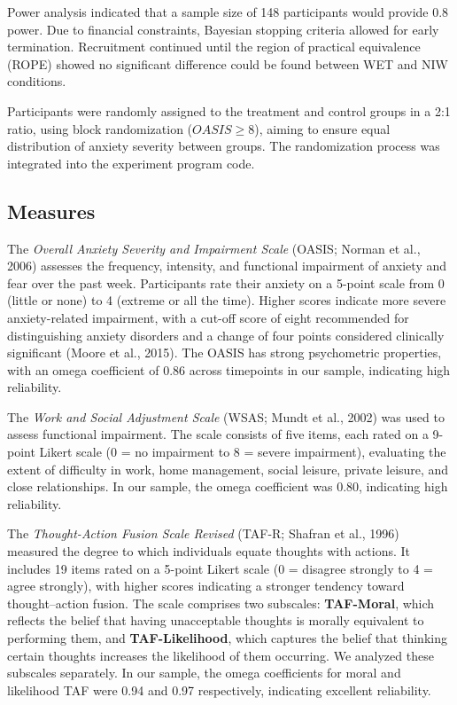 \documentclass[
  man,floatsintext]{apa7}
\begin{document}
Power analysis indicated that a sample size of 148 participants would provide 0.8 power.
Due to financial constraints, Bayesian stopping criteria allowed for early termination.
Recruitment continued until the region of practical equivalence (ROPE) showed no significant difference could be found between WET and NIW conditions.

Participants were randomly assigned to the treatment and control groups in a 2:1 ratio, using block randomization (\(OASIS \geq 8\)), aiming to ensure equal distribution of anxiety severity between groups.
The randomization process was integrated into the experiment program code.

\subsection{Measures}\label{measures}

The \emph{Overall Anxiety Severity and Impairment Scale} (OASIS; Norman et al., 2006) assesses the frequency, intensity, and functional impairment of anxiety and fear over the past week.
Participants rate their anxiety on a 5-point scale from 0 (little or none) to 4 (extreme or all the time).
Higher scores indicate more severe anxiety-related impairment, with a cut-off score of eight recommended for distinguishing anxiety disorders and a change of four points considered clinically significant (Moore et al., 2015).
The OASIS has strong psychometric properties, with an omega coefficient of 0.86 across timepoints in our sample, indicating high reliability.

The \emph{Work and Social Adjustment Scale} (WSAS; Mundt et al., 2002) was used to assess functional impairment.
The scale consists of five items, each rated on a 9-point Likert scale (0 = no impairment to 8 = severe impairment), evaluating the extent of difficulty in work, home management, social leisure, private leisure, and close relationships.
In our sample, the omega coefficient was 0.80, indicating high reliability.

The \emph{Thought-Action Fusion Scale Revised} (TAF-R; Shafran et al., 1996) measured the degree to which individuals equate thoughts with actions.
It includes 19 items rated on a 5-point Likert scale (0 = disagree strongly to 4 = agree strongly), with higher scores indicating a stronger tendency toward thought--action fusion.
The scale comprises two subscales: \textbf{TAF-Moral}, which reflects the belief that having unacceptable thoughts is morally equivalent to performing them, and \textbf{TAF-Likelihood}, which captures the belief that thinking certain thoughts increases the likelihood of them occurring.
We analyzed these subscales separately.
In our sample, the omega coefficients for moral and likelihood TAF were 0.94 and 0.97 respectively, indicating excellent reliability.
\end{document}
